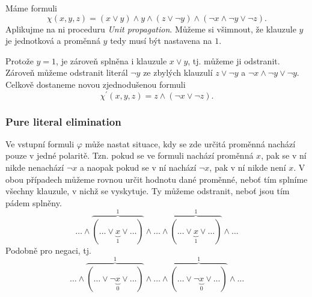\begin{example}
    Máme formuli
    \[\chi(x,y,z)=(x\lor y)\land y\land (z\lor \neg y)\land(\neg x\land \neg y\lor \neg z).\]
    Aplikujme na ni proceduru \emph{Unit propagation}. Můžeme si všimnout, že klauzule $y$ je jednotková a proměnná $y$ tedy musí být nastavena na $1$.

    Protože $y=1$, je zároveň splněna i klauzule $x\lor y$, tj. můžeme ji odstranit. Zároveň můžeme odstranit literál $\neg y$ ze zbylých klauzulí $z\lor \neg y$ a $\neg x\land \neg y\lor \neg y$.
    Celkově dostaneme novou zjednodušenou formuli
    \[\chi^\prime(x,y,z)=z\land(\neg x\lor \neg z).\]
\end{example}

\subsubsection*{Pure literal elimination}

Ve vstupní formuli $\varphi$ může nastat situace, kdy se zde určitá proměnná nachází pouze v jedné polaritě. Tzn. pokud se ve formuli nachází proměnná $x$, pak se v ní nikde nenachází $\neg x$ a naopak pokud se v ní nachází $\neg x$, pak v ní nikde není $x$. V obou případech můžeme rovnou určit hodnotu dané proměnné, neboť tím splníme všechny klauzule, v nichž se vyskytuje. Ty můžeme odstranit, neboť jsou tím pádem splněny.
\[\dots\land\overbrace{(\dots\lor \underbrace{x}_{1}\lor\dots)}^{1}\land\dots\land\overbrace{(\dots\lor \underbrace{x}_{1}\lor\dots)}^{1}\land\dots\]
Podobně pro negaci, tj.
\[\dots\land\overbrace{(\dots\lor \neg\underbrace{x}_{0}\lor\dots)}^{1}\land\dots\land\overbrace{(\dots\lor \neg\underbrace{x}_{0}\lor\dots)}^{1}\land\dots\]

